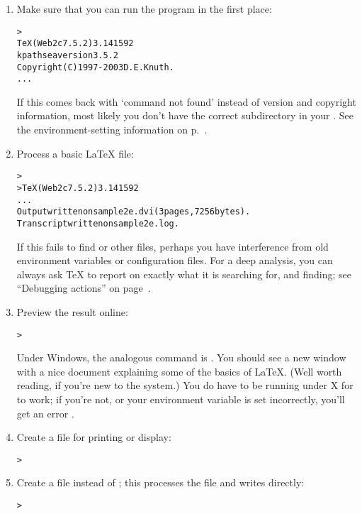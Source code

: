 \documentclass{article}
\begin{document}
\begin{enumerate}

\item Make sure that you can run the  program in the first
place:

\begin{alltt}
> 
TeX (Web2c 7.5.2) 3.141592
kpathsea version 3.5.2
Copyright (C) 1997-2003 D.E. Knuth.
...
\end{alltt}
If this comes back with `command not found' instead of version and
copyright information, most likely you don't have the correct
 subdirectory in your .  See
the environment-setting information on p.~\pageref{text:path}.

\item Process a basic \LaTeX{} file:
\begin{alltt}
> 
>TeX (Web2c 7.5.2) 3.141592
...
Output written on sample2e.dvi (3 pages, 7256 bytes).
Transcript written on sample2e.log.
\end{alltt}
If this fails to find  or other files, perhaps
you have interference from old environment variables or configuration
files.  For a deep analysis, you can always ask \TeX{} to report on
exactly what it is searching for, and finding; see ``Debugging actions''
on page~\pageref{Debugging}.

\item Preview the result online:
\begin{alltt}
> 
\end{alltt}
Under Windows, the analogous command is .  You should
see a new window with a nice document explaining some of the basics of
\LaTeX{}.  (Well worth reading, if you're new to the system.)  You do
have to be running under X for  to work; if you're not, or
your  environment variable is set incorrectly, you'll
get an error .

\item Create a \PS{} file for printing or display:
\begin{alltt}
> 
\end{alltt}

\item Create a  file instead of \dvi{}; this processes the
 file and writes  directly:
\begin{alltt}
> 
\end{alltt}


\end{enumerate}
\end{document}
